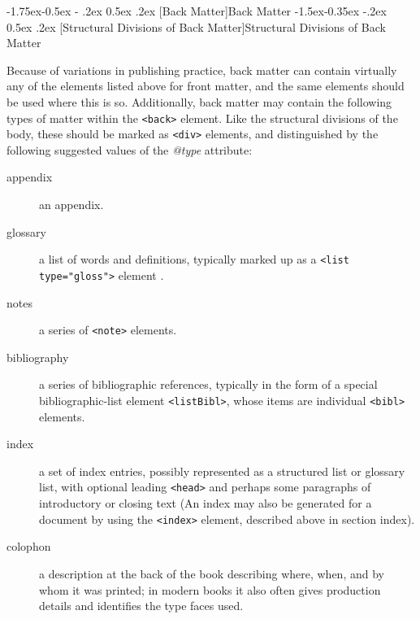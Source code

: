\documentclass[11pt,twoside]{article}\makeatletter
\makeatletter
\renewcommand\subsection{\@startsection{subsection}{2}{\z@}%
     {-1.75ex\@plus -0.5ex \@minus- .2ex}%
     {0.5ex \@plus .2ex}%
     {\reset@font\Large\sffamily}}
\renewcommand\subsubsection{\@startsection{subsubsection}{3}{\z@}%
     {-1.5ex\@plus -0.35ex \@minus -.2ex}%
     {0.5ex \@plus .2ex}%
     {\reset@font\large\sffamily}}
\makeatother
\begin{document}
\subsection[{Back Matter}]{Back Matter}
\subsubsection[{Structural Divisions of Back Matter}]{Structural Divisions of Back Matter}\par
Because of variations in publishing practice, back matter can contain virtually any of the elements listed above for front matter, and the same elements should be used where this is so. Additionally, back matter may contain the following types of matter within the \texttt{<back>} element. Like the structural divisions of the body, these should be marked as \texttt{<div>} elements, and distinguished by the following suggested values of the \textit{@type} attribute: \begin{description}

\item[{appendix}]an appendix.
\item[{glossary}]a list of words and definitions, typically marked up as a \texttt{<list type="gloss">} element .
\item[{notes}]a series of \texttt{<note>} elements.
\item[{bibliography}]a series of bibliographic references, typically in the form of a special bibliographic-list element \texttt{<listBibl>}, whose items are individual \texttt{<bibl>} elements.
\item[{index}]a set of index entries, possibly represented as a structured list or glossary list, with optional leading \texttt{<head>} and perhaps some paragraphs of introductory or closing text (An index may also be generated for a document by using the \texttt{<index>} element, described above in section index).
\item[{colophon}]a description at the back of the book describing where, when, and by whom it was printed; in modern books it also often gives production details and identifies the type faces used.
\end{description} 
\end{document}
